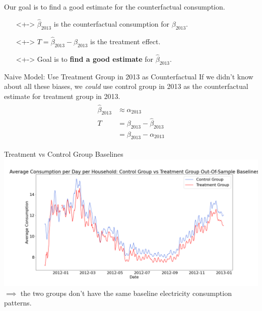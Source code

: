 \documentclass{beamer}
\begin{document}
\begin{frame}{Our goal is to find a good estimate for the counterfactual consumption.}
  \begin{itemize}
    \item[]<+-> $\hat\beta_{2013}$ is the counterfactual consumption for $\beta_{2013}$.
    \item[]<+-> $T = \hat\beta_{2013} - \beta_{2013}$ is the treatment effect.
    \item[]<+-> Goal is to \textbf{find a good estimate} for $\hat\beta_{2013}$.
  \end{itemize}
\end{frame}

\begin{frame}{Naive Model: Use Treatment Group in 2013 as Counterfactual}
  If we didn't know about all these biases, we \textit{could} use control group in 2013 as the counterfactual estimate for treatment group in 2013.
  \begin{align}
    \begin{split}
      \hat\beta_{2013} & \approx \alpha_{2013} \\
      T & = \beta_{2013} - \hat\beta_{2013} \\
        & = \beta_{2013} - \alpha_{2013}
    \end{split}
  \end{align}
\end{frame}

\begin{frame}{Treatment vs Control Group Baselines}
  \centering
  \includegraphics[width=1\textwidth]{images/avg-consumption-per-day-baseline.png}
  $\implies$ the two groups don't have the same baseline electricity consumption patterns.
\end{frame}
\end{document}
